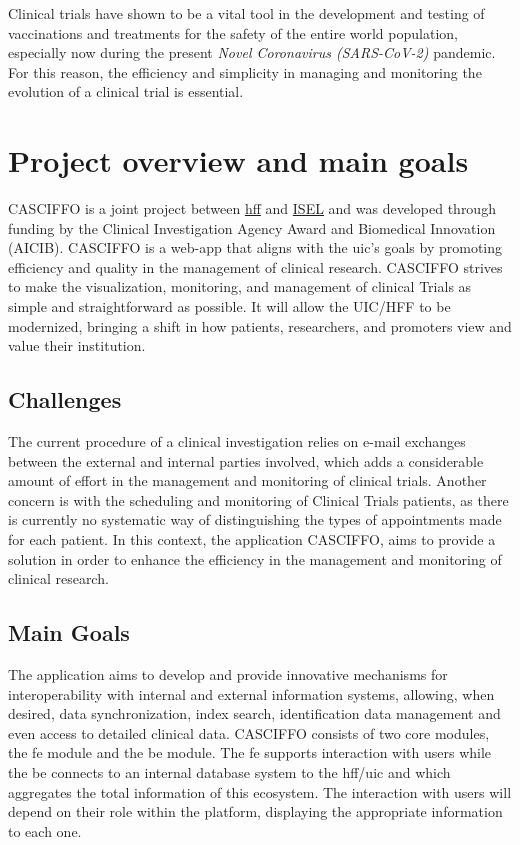 Clinical trials have shown to be a vital tool in the development and testing of vaccinations and treatments for the safety of the entire world population, especially now during the present \textit{Novel Coronavirus (SARS-CoV-2)} pandemic. For this reason, the efficiency and simplicity in managing and monitoring the evolution of a clinical trial is essential.  

\section{Project overview and main goals}\label{ch:intro:sec:casciffo}

CASCIFFO is a joint project between \href{https://hff.min-saude.pt/}{\acrshort{hff}} and \href{https://www.isel.pt/}{ISEL} and was developed through funding by the Clinical Investigation Agency Award and Biomedical Innovation (AICIB).  
CASCIFFO is a web-app that aligns with the \acrshort{uic}'s goals by promoting efficiency and quality in the management of clinical research.
CASCIFFO strives to make the visualization, monitoring, and management of clinical Trials as simple and straightforward as possible.   
It will allow the UIC/HFF to be modernized, bringing a shift in how patients, researchers, and promoters view and value their institution.  

\subsection{Challenges}
The current procedure of a clinical investigation relies on e-mail exchanges between the external and internal parties involved, which adds a considerable amount of effort in the management and monitoring of clinical trials. Another concern is with the scheduling and monitoring of Clinical Trials patients, as there is currently no systematic way of distinguishing the types of appointments made for each patient.  
In this context, the application CASCIFFO, aims to provide a solution in order to enhance the efficiency in the management and monitoring of clinical research.

\subsection{Main Goals}
The application aims to develop and provide innovative mechanisms for interoperability with internal and external information systems, allowing, when desired, data synchronization, index search, identification data management and even access to detailed clinical data. 
CASCIFFO consists of two core modules, the \acrfull{fe} module and the \acrfull{be} module. The \acrshort{fe} supports interaction with users while the \acrshort{be} connects to an internal database system to the \acrshort{hff}/\acrshort{uic} and which aggregates the total information of this ecosystem.  
The interaction with users will depend on their role within the platform, displaying the appropriate information to each one. 


